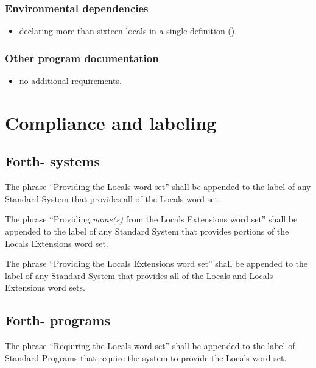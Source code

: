 \subsubsection{Environmental dependencies} %
\label{locals:environment}
\begin{itemize}
\item declaring more than sixteen locals in a single definition
	().
\end{itemize}

\subsubsection{Other program documentation} %
\begin{itemize}
\item no additional requirements.
\end{itemize}


\section{Compliance and labeling} %

\cbstart{}
\subsection[Forth-\snapshot systems]{Forth-\snapshot{} systems} %
\cbend

The phrase ``Providing the Locals word set'' shall be appended to
the label of any Standard System that provides all of the Locals
word set.

The phrase ``Providing \emph{name(s)} from the Locals Extensions
word set'' shall be appended to the label of any Standard System
that provides portions of the Locals Extensions word set.

The phrase ``Providing the Locals Extensions word set'' shall be
appended to the label of any Standard System that provides all of
the Locals and Locals Extensions word sets.

\cbstart{}
\subsection[Forth-\snapshot programs]{Forth-\snapshot{} programs} %
\cbend

The phrase ``Requiring the Locals word set'' shall be appended to
the label of Standard Programs that require the system to provide
the Locals word set.

